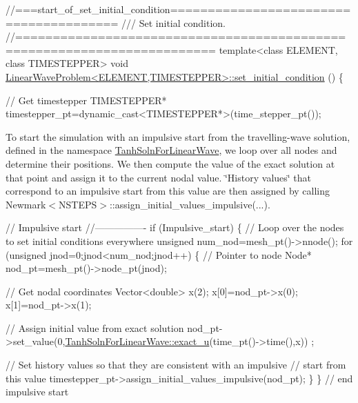 \begin{DoxyCodeInclude}
\textcolor{comment}{//===start\_of\_set\_initial\_condition=======================================}
\textcolor{comment}{/// Set initial condition.}
\textcolor{comment}{}\textcolor{comment}{//========================================================================}
\textcolor{keyword}{template}<\textcolor{keyword}{class} ELEMENT, \textcolor{keyword}{class} TIMESTEPPER>
\textcolor{keywordtype}{void} \hyperlink{classLinearWaveProblem_afb5d327791d8289a8a0a565afc8aee37}{LinearWaveProblem<ELEMENT,TIMESTEPPER>::set\_initial\_condition}
      ()
\{ 

 \textcolor{comment}{// Get timestepper}
 TIMESTEPPER* timestepper\_pt=\textcolor{keyword}{dynamic\_cast<}TIMESTEPPER*\textcolor{keyword}{>}(time\_stepper\_pt());

\end{DoxyCodeInclude}


To start the simulation with an impulsive start from the travelling-\/wave solution, defined in the namespace {\ttfamily \hyperlink{namespaceTanhSolnForLinearWave}{Tanh\+Soln\+For\+Linear\+Wave}}, we loop over all nodes and determine their positions. We then compute the value of the exact solution at that point and assign it to the current nodal value. \char`\"{}\+History values\char`\"{} that correspond to an impulsive start from this value are then assigned by calling {\ttfamily Newmark$<$\+N\+S\+T\+E\+P\+S$>$\+::assign\+\_\+initial\+\_\+values\+\_\+impulsive}(...).


\begin{DoxyCodeInclude}


 \textcolor{comment}{// Impulsive start}
 \textcolor{comment}{//----------------}
 \textcolor{keywordflow}{if} (Impulsive\_start)
  \{
   \textcolor{comment}{// Loop over the nodes to set initial conditions everywhere}
   \textcolor{keywordtype}{unsigned} num\_nod=mesh\_pt()->nnode();
   \textcolor{keywordflow}{for} (\textcolor{keywordtype}{unsigned} jnod=0;jnod<num\_nod;jnod++)
    \{
     \textcolor{comment}{// Pointer to node}
     Node* nod\_pt=mesh\_pt()->node\_pt(jnod);

     \textcolor{comment}{// Get nodal coordinates}
     Vector<double> x(2);
     x[0]=nod\_pt->x(0);
     x[1]=nod\_pt->x(1);

     \textcolor{comment}{// Assign initial value from exact solution}
     nod\_pt->set\_value(0,\hyperlink{namespaceTanhSolnForLinearWave_aceea2935b2d3815ce72aae8c9de2b468}{TanhSolnForLinearWave::exact\_u}(time\_pt()->time(),x))
      ;

     \textcolor{comment}{// Set history values so that they are consistent with an impulsive}
     \textcolor{comment}{// start from this value}
     timestepper\_pt->assign\_initial\_values\_impulsive(nod\_pt);
    \}
  \} \textcolor{comment}{// end impulsive start}

\end{DoxyCodeInclude}


